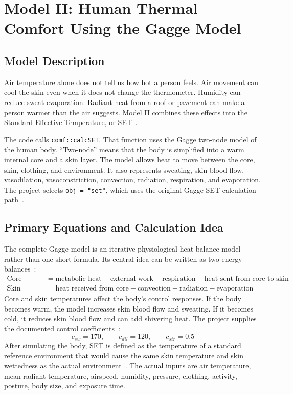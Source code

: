 \section{Model II: Human Thermal Comfort Using the Gagge Model}
\subsection{Model Description}
 
Air temperature alone does not tell us how hot a person feels. Air movement can cool the skin even when it does not change the thermometer. Humidity can reduce sweat evaporation. Radiant heat from a roof or pavement can make a person warmer than the air suggests. Model II combines these effects into the Standard Effective Temperature, or SET~\cite{ashrae_thermal_comfort_2025}.
 
The code calls \texttt{comf::calcSET}. That function uses the Gagge two-node model of the human body. ``Two-node'' means that the body is simplified into a warm internal core and a skin layer. The model allows heat to move between the core, skin, clothing, and environment. It also represents sweating, skin blood flow, vasodilation, vasoconstriction, convection, radiation, respiration, and evaporation. The project selects \texttt{obj = "set"}, which uses the original Gagge SET calculation path~\cite{comf_0112_set}.
 
\subsection{Primary Equations and Calculation Idea}
 
The complete Gagge model is an iterative physiological heat-balance model rather than one short formula. Its central idea can be written as two energy balances~\cite{cbe_two_node}:
\begin{align}
\text{Core storage} &= \text{metabolic heat} - \text{external work} - \text{respiration} - \text{heat sent from core to skin} \\
\text{Skin storage} &= \text{heat received from core} - \text{convection} - \text{radiation} - \text{evaporation}
\end{align}
Core and skin temperatures affect the body's control responses. If the body becomes warm, the model increases skin blood flow and sweating. If it becomes cold, it reduces skin blood flow and can add shivering heat. The project supplies the documented control coefficients~\cite{comf_0112_set}:
\begin{equation}
c_{sw} = 170, \qquad c_{dil} = 120, \qquad c_{str} = 0.5
\end{equation}
After simulating the body, SET is defined as the temperature of a standard reference environment that would cause the same skin temperature and skin wettedness as the actual environment~\cite{ashrae_thermal_comfort_2025}. The actual inputs are air temperature, mean radiant temperature, airspeed, humidity, pressure, clothing, activity, posture, body size, and exposure time.
 
